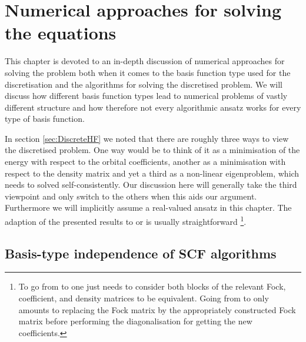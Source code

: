 \chapter{Numerical approaches for solving the \HF equations}
\label{ch:NumSolveHF}
\newcommand{\kexp}{\ensuremath k_\text{exp}}

This chapter is devoted to an in-depth discussion of
numerical approaches for solving the \HF problem
both when it comes to the basis function type used for the discretisation
and the algorithms for solving the discretised problem.
We will discuss how different basis function types
lead to numerical problems of vastly different structure
and how therefore not every algorithmic ansatz works
for every type of basis function.

In section \ref{sec:DiscreteHF} we noted that there are
roughly three ways to view the discretised \HF problem.
One way would be to think of it as a minimisation of the energy
with respect to the orbital coefficients,
another as a minimisation with respect to the density matrix
and yet a third as a non-linear eigenproblem,
which needs to solved self-consistently.
Our discussion here will generally take the third viewpoint
and only switch to the others when this aids our argument.
Furthermore we will implicitly assume a real-valued
\UHF ansatz in this chapter.
The adaption of the presented results to
\RHF or \ROHF is usually straightforward%
\footnote{
To go from \UHF to \RHF one just needs to consider both blocks of the relevant
Fock, coefficient, and density matrices to be equivalent.
Going from \UHF to \ROHF only amounts to replacing the \UHF Fock matrix
by the appropriately constructed \ROHF Fock matrix before performing
the diagonalisation for getting the new coefficients.
}.






\section{Basis-type independence of SCF algorithms}


